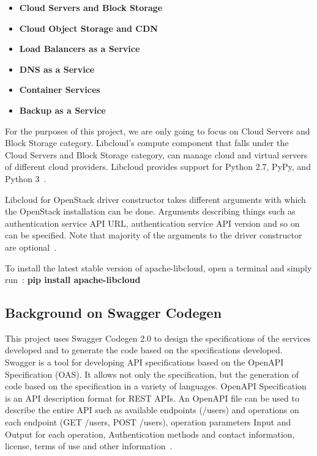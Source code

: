 \begin{itemize}
\item \textbf{Cloud Servers and Block Storage}
\item \textbf{Cloud Object Storage and CDN}
\item \textbf{Load Balancers as a Service}
\item \textbf{DNS as a Service}
\item \textbf{Container Services}
\item \textbf{Backup as a Service}
\end{itemize}

For the purposes of this project, we are only going to focus on Cloud Servers
and Block Storage category. Libcloud's compute component that falls under the
Cloud Servers and Block Storage category, can manage cloud and virtual servers
of different cloud providers. Libcloud provides support for Python 2.7, PyPy,
and Python 3~\cite{hid-sp18-516-www-libcloud-compute}. 

Libcloud for OpenStack driver constructor takes different arguments with which
the OpenStack installation can be done. Arguments describing things such as
authentication service API URL, authentication service API version and so on 
can be specified. Note that majority of the arguments to the driver 
constructor are optional~\cite{hid-sp18-516-www-libcloud-openstack}. 

To install the latest stable version of apache-libcloud, open a terminal and
simply run~\cite{hid-sp18-516-www-libcloud}:
\textbf{pip install apache-libcloud}

\subsection{Background on Swagger Codegen}
This project uses Swagger Codegen 2.0 to design the specifications of the
services developed and to generate the code based on the specifications
developed. Swagger is a tool for developing API specifications based on the
OpenAPI Specification (OAS). It allows not only the specification, but the
generation of code based on the specification in a variety of languages. 
OpenAPI Specification is an API description format for REST APIs. An OpenAPI 
file can be used to describe the entire API such as available endpoints 
(/users) and operations on each endpoint (GET /users, POST /users), operation 
parameters Input and Output for each operation, Authentication methods and 
contact information, license, terms of use and other
information~\cite{hid-sp18-516-www-swagger}. 

